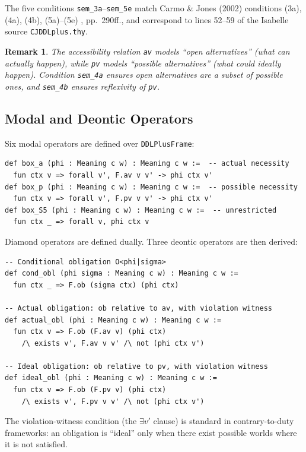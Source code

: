 \documentclass[]{article}
\newtheorem{remark}[theorem]{Remark}
\newcommand{\code}[1]{\texttt{#1}}
\begin{document}
\noindent
The five conditions \code{sem\_3a}--\code{sem\_5e} match Carmo \& Jones (2002)
conditions (3a), (4a), (4b), (5a)--(5e) \cite{CarmoJones2002}, pp.~290ff., and
correspond to lines 52--59 of the Isabelle source \code{CJDDLplus.thy}.

\begin{remark}
The accessibility relation \code{av} models ``open alternatives'' (what can
actually happen), while \code{pv} models ``possible alternatives'' (what could
ideally happen).  Condition \code{sem\_4a} ensures open alternatives are a
subset of possible ones, and \code{sem\_4b} ensures reflexivity of \code{pv}.
\end{remark}

\subsection{Modal and Deontic Operators}

Six modal operators are defined over \code{DDLPlusFrame}:

\begin{lstlisting}
def box_a (phi : Meaning c w) : Meaning c w :=  -- actual necessity
  fun ctx v => forall v', F.av v v' -> phi ctx v'
def box_p (phi : Meaning c w) : Meaning c w :=  -- possible necessity
  fun ctx v => forall v', F.pv v v' -> phi ctx v'
def box_S5 (phi : Meaning c w) : Meaning c w :=  -- unrestricted
  fun ctx _ => forall v, phi ctx v
\end{lstlisting}

\noindent
Diamond operators are defined dually.
Three deontic operators are then derived:

\begin{lstlisting}
-- Conditional obligation O<phi|sigma>
def cond_obl (phi sigma : Meaning c w) : Meaning c w :=
  fun ctx _ => F.ob (sigma ctx) (phi ctx)

-- Actual obligation: ob relative to av, with violation witness
def actual_obl (phi : Meaning c w) : Meaning c w :=
  fun ctx v => F.ob (F.av v) (phi ctx)
    /\ exists v', F.av v v' /\ not (phi ctx v')

-- Ideal obligation: ob relative to pv, with violation witness
def ideal_obl (phi : Meaning c w) : Meaning c w :=
  fun ctx v => F.ob (F.pv v) (phi ctx)
    /\ exists v', F.pv v v' /\ not (phi ctx v')
\end{lstlisting}

\noindent
The violation-witness condition (the $\exists v'$ clause) is standard in
contrary-to-duty frameworks: an obligation is ``ideal'' only when there exist
possible worlds where it is not satisfied.
\end{document}
